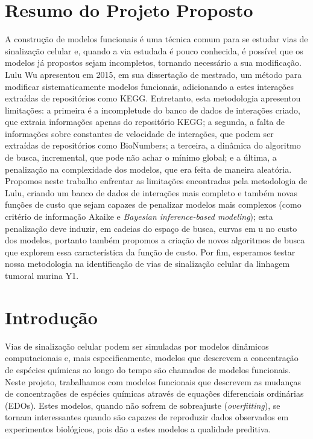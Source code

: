 \documentclass[12pt]{article}
\newcommand{\foreignword}[1]{\textit{#1}}
\begin{document}
\section{Resumo do Projeto Proposto} \label{sec:resumo} %
A construção de modelos funcionais é uma técnica comum para se 
estudar vias de sinalização celular e, quando a via estudada é pouco
conhecida, é possível que os modelos já propostos sejam incompletos, 
tornando necessário a sua modificação.
Lulu Wu apresentou em 2015, em sua dissertação de mestrado, um método 
para  modificar sistematicamente modelos funcionais, adicionando a estes
interações extraídas de repositórios como KEGG. Entretanto, esta 
metodologia apresentou limitações: a primeira é a incompletude do banco 
de dados de interações criado, que extraia informações apenas do 
repositório KEGG; a segunda, a falta de informações sobre constantes 
de velocidade de interações, que podem ser extraídas de repositórios 
como BioNumbers; a terceira, a dinâmica do algoritmo de busca, 
incremental, que pode não achar o mínimo global; e a última, a 
penalização na complexidade dos modelos, que era feita de maneira 
aleatória. Propomos neste trabalho enfrentar as limitações encontradas
pela metodologia de Lulu, criando um banco de dados de interações mais
completo e também novas funções de custo que sejam capazes de 
penalizar modelos mais complexos (como critério de informação Akaike e 
{\em Bayesian inference-based modeling}); esta penalização deve induzir,
em cadeias do  espaço de busca, curvas em u no custo dos modelos, 
portanto também propomos a criação de novos algoritmos de busca que 
explorem essa característica da função de custo. Por fim, esperamos 
testar nossa metodologia na identificação de vias de sinalização celular 
da linhagem tumoral murina Y1.

\section{Introdução}
Vias de sinalização celular podem ser simuladas por modelos dinâmicos
computacionais e, mais especificamente, modelos que descrevem a 
concentração de espécies químicas ao longo do tempo são chamados de 
modelos funcionais. Neste projeto, trabalhamos com modelos funcionais
que descrevem as mudanças de concentrações de espécies químicas através
de equações diferenciais ordinárias (EDOs). Estes modelos, quando não 
sofrem de sobreajuste (\foreignword{overfitting}), se tornam 
interessantes quando são capazes de reproduzir dados observados em 
experimentos biológicos, pois dão a estes modelos a qualidade preditiva.
\end{document}
